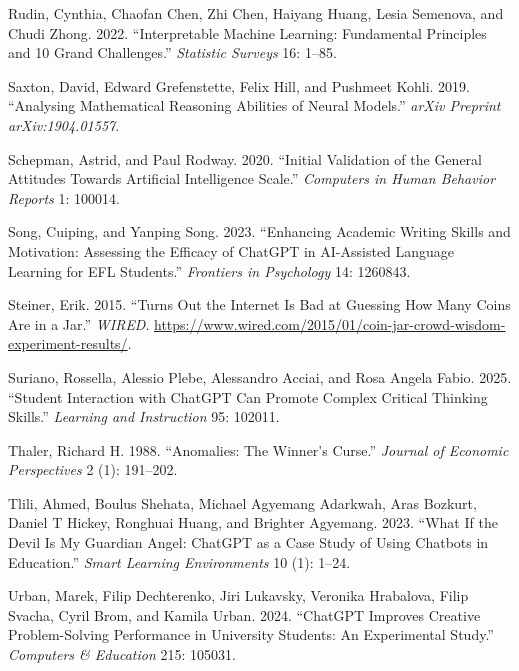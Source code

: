 \documentclass[
  11pt,
]{article}
\newlength{\cslhangindent}
\newenvironment{CSLReferences}[2] %
 {\begin{list}{}{%
  \setlength{\itemindent}{0pt}
  \setlength{\leftmargin}{0pt}
  \setlength{\parsep}{0pt}
  \ifodd #1
   \setlength{\leftmargin}{\cslhangindent}
   \setlength{\itemindent}{-1\cslhangindent}
  \fi
  \setlength{\itemsep}{#2\baselineskip}}}
 {\end{list}}
\begin{document}
\begin{CSLReferences}{1}{0}
Rudin, Cynthia, Chaofan Chen, Zhi Chen, Haiyang Huang, Lesia Semenova, and Chudi Zhong. 2022. {``Interpretable Machine Learning: Fundamental Principles and 10 Grand Challenges.''} \emph{Statistic Surveys} 16: 1--85.

Saxton, David, Edward Grefenstette, Felix Hill, and Pushmeet Kohli. 2019. {``Analysing Mathematical Reasoning Abilities of Neural Models.''} \emph{arXiv Preprint arXiv:1904.01557}.

Schepman, Astrid, and Paul Rodway. 2020. {``Initial Validation of the General Attitudes Towards Artificial Intelligence Scale.''} \emph{Computers in Human Behavior Reports} 1: 100014.

Song, Cuiping, and Yanping Song. 2023. {``Enhancing Academic Writing Skills and Motivation: Assessing the Efficacy of ChatGPT in AI-Assisted Language Learning for EFL Students.''} \emph{Frontiers in Psychology} 14: 1260843.

Steiner, Erik. 2015. {``Turns Out the Internet Is Bad at Guessing How Many Coins Are in a Jar.''} \emph{WIRED}. \url{https://www.wired.com/2015/01/coin-jar-crowd-wisdom-experiment-results/}.

Suriano, Rossella, Alessio Plebe, Alessandro Acciai, and Rosa Angela Fabio. 2025. {``Student Interaction with ChatGPT Can Promote Complex Critical Thinking Skills.''} \emph{Learning and Instruction} 95: 102011.

Thaler, Richard H. 1988. {``Anomalies: The Winner's Curse.''} \emph{Journal of Economic Perspectives} 2 (1): 191--202.

Tlili, Ahmed, Boulus Shehata, Michael Agyemang Adarkwah, Aras Bozkurt, Daniel T Hickey, Ronghuai Huang, and Brighter Agyemang. 2023. {``What If the Devil Is My Guardian Angel: ChatGPT as a Case Study of Using Chatbots in Education.''} \emph{Smart Learning Environments} 10 (1): 1--24.

Urban, Marek, Filip Dechterenko, Jiri Lukavsky, Veronika Hrabalova, Filip Svacha, Cyril Brom, and Kamila Urban. 2024. {``ChatGPT Improves Creative Problem-Solving Performance in University Students: An Experimental Study.''} \emph{Computers \& Education} 215: 105031.


\end{CSLReferences}
\end{document}
